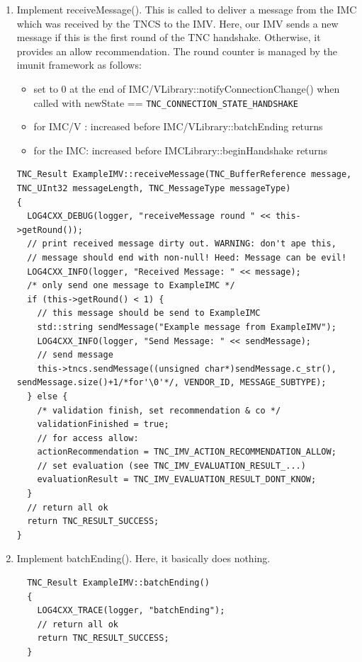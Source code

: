 \documentclass[a4paper,10pt]{scrartcl}
\begin{document}
\begin{enumerate}
\begin{enumerate}
  \begin{enumerate}
   \item Implement receiveMessage(). This is called to deliver a message from the IMC which was received by the TNCS to the IMV. Here, our IMV sends a new message
   if this is the first round of the TNC handshake. Otherwise, it provides an allow recommendation. The round counter is managed by the imunit
   framework as follows:
   \begin{itemize}
    \item set to 0 at the end of IMC/VLibrary::notifyConnectionChange() when called with newState == \verb+TNC_CONNECTION_STATE_HANDSHAKE+
    \item for IMC/V  : increased before IMC/VLibrary::batchEnding returns
    \item for the IMC: increased before IMCLibrary::beginHandshake returns
   \end{itemize}
  \begin{lstlisting}
TNC_Result ExampleIMV::receiveMessage(TNC_BufferReference message, TNC_UInt32 messageLength, TNC_MessageType messageType)
{
  LOG4CXX_DEBUG(logger, "receiveMessage round " << this->getRound());
  // print received message dirty out. WARNING: don't ape this,
  // message should end with non-null! Heed: Message can be evil!
  LOG4CXX_INFO(logger, "Received Message: " << message);
  /* only send one message to ExampleIMC */
  if (this->getRound() < 1) {
    // this message should be send to ExampleIMC
    std::string sendMessage("Example message from ExampleIMV");
    LOG4CXX_INFO(logger, "Send Message: " << sendMessage);
    // send message
    this->tncs.sendMessage((unsigned char*)sendMessage.c_str(), sendMessage.size()+1/*for'\0'*/, VENDOR_ID, MESSAGE_SUBTYPE);
  } else {
    /* validation finish, set recommendation & co */
    validationFinished = true;
    // for access allow:
    actionRecommendation = TNC_IMV_ACTION_RECOMMENDATION_ALLOW;
    // set evaluation (see TNC_IMV_EVALUATION_RESULT_...)
    evaluationResult = TNC_IMV_EVALUATION_RESULT_DONT_KNOW;
  }
  // return all ok
  return TNC_RESULT_SUCCESS;
}
  \end{lstlisting}

  \item Implement batchEnding(). Here, it basically does nothing.
  \begin{lstlisting}
  TNC_Result ExampleIMV::batchEnding()
  {
    LOG4CXX_TRACE(logger, "batchEnding");
    // return all ok
    return TNC_RESULT_SUCCESS;
  }
  \end{lstlisting}


\end{enumerate}
\end{enumerate}
\end{enumerate}
\end{document}
